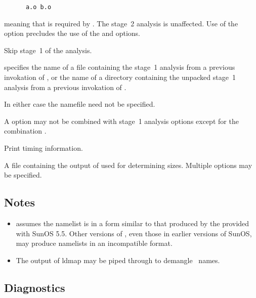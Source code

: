 \begin{description}
   \begin{verbatim}
      a.o b.o
   \end{verbatim}

   \noindent
   meaning that  is required by .  The stage~2 analysis is
   unaffected.  Use of the  option precludes the use of the 
   and  options.

\item[\code{\exe{-s} file | \exe{-S} directory}]
   Skip stage~1 of the analysis.

    specifies the name of a file containing the stage~1 analysis from
   a previous invokation of , or the name of a directory
   containing the unpacked stage~1 analysis from a previous invokation of
   .

   In either case the namefile need not be specified.

   A  option may not be combined with stage~1 analysis options except
   for the combination .

\item[\exe{-t}]
   Print timing information.

\item[\code{\exe{-v} file}]
   A file containing the output of  used for determining sizes.
   Multiple  options may be specified.
\end{description}

\subsection*{Notes}

\begin{itemize}
\item
    assumes the namelist is in a form similar to that produced by
   the  provided with SunOS 5.5.  Other versions of ,
   even those in earlier versions of SunOS, may produce namelists in an
   incompatible format.

\item
   The output of ldmap may be piped through  to demangle
   \cplusplus\ names.
\end{itemize}

\subsection*{Diagnostics}

